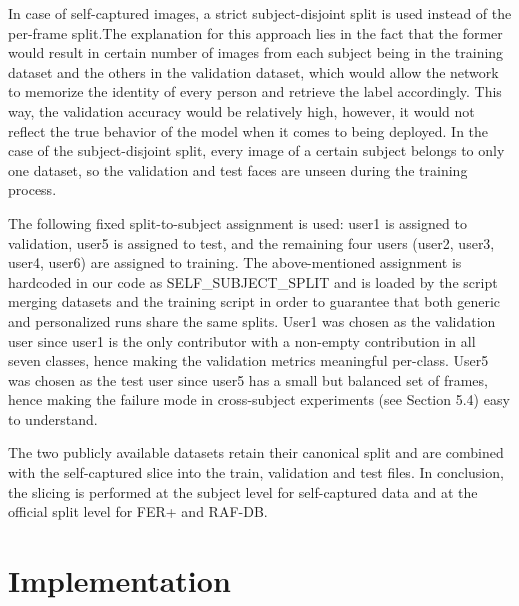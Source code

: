 \documentclass[12pt,a4paper]{article}
\begin{document}
In case of self-captured images, a strict subject-disjoint split is used instead of the per-frame split.The explanation for this approach lies in the fact that the former would result in certain number of images from each subject being in the training dataset and the others in the validation dataset, which would allow the network to memorize the identity of every person and retrieve the label accordingly. This way, the validation accuracy would be relatively high, however, it would not reflect the true behavior of the model when it comes to being deployed. In the case of the subject-disjoint split, every image of a certain subject belongs to only one dataset, so the validation and test faces are unseen during the training process.

The following fixed split-to-subject assignment is used: user1 is assigned to validation, user5
is assigned to test, and the remaining four users (user2, user3, user4, user6) are assigned
to training. The above-mentioned assignment is hardcoded in our code as SELF_SUBJECT_SPLIT and is loaded by the script merging datasets and the training script in order to guarantee that both generic and personalized runs share the same splits. User1 was chosen as the validation user since user1 is the only contributor with a non-empty contribution in all seven classes, hence making the validation metrics meaningful per-class. User5 was chosen as the test user since user5 has a small but balanced set of frames, hence making the failure mode in cross-subject experiments (see Section 5.4) easy to understand.

The two publicly available datasets retain their canonical split and are combined with the self-captured slice into the train, validation and test files. In conclusion, the slicing is performed at the subject level for self-captured data and at the official split level for FER+ and RAF-DB.

\section{Implementation}
\label{sec:impl}

\end{document}
